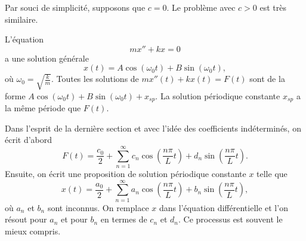 Par souci de simplicité, supposons que $ c = 0 $. Le problème avec $ c> 0 $ est très
similaire.

L'équation
\begin{equation*}
mx'' + kx = 0 
\end{equation*}
a une solution générale
\begin{equation*}
x(t) = A \cos (\omega_0 t) + 
B \sin (\omega_0 t) ,
\end{equation*}
où $\omega_0 = \sqrt{\frac{k}{m}}$.
Toutes les solutions de
$mx''(t) + kx(t) = F(t)$ sont de la forme
$A \cos (\omega_0 t) + B \sin (\omega_0 t) + x_{sp}$.
La solution périodique constante $x_{sp}$ a la même période que  $F(t)$.

Dans l'esprit de la dernière section et avec l'idée des coefficients indéterminés,
on écrit d'abord
\begin{equation*}
F(t) = \frac{c_0}{2} + \sum_{n=1}^\infty
c_n \cos \left( \frac{n \pi}{L} t \right) +
d_n \sin \left( \frac{n \pi}{L} t \right) .
\end{equation*}
Ensuite, on écrit une proposition de solution périodique constante $x$ telle que
\begin{equation*}
x(t) = \frac{a_0}{2} + \sum_{n=1}^\infty
a_n \cos \left( \frac{n \pi}{L} t \right) +
b_n \sin \left( \frac{n \pi}{L} t \right) ,
\end{equation*}
où $a_n$ et $b_n$ sont inconnus.
On remplace $x$ dans l'équation différentielle et l'on résout pour $a_n$ et pour
$b_n$ en termes de $c_n$ et $d_n$. Ce processus est souvent le mieux compris.
\pagebreak[2]

